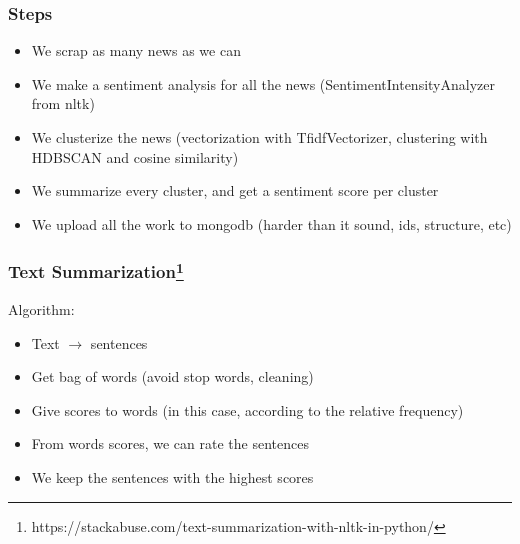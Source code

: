 \documentclass[12pt]{beamer}
\begin{document}
\begin{frame}
\frametitle{Steps}
\begin{itemize}
\item We scrap as many news as we can
\item We make a sentiment analysis for all the news (SentimentIntensityAnalyzer from nltk)
\item We clusterize the news (vectorization with TfidfVectorizer, clustering with HDBSCAN and cosine similarity)
\item We summarize every cluster, and get a sentiment score per cluster
\item We upload all the work to mongodb (harder than it sound, ids, structure, etc)
\end{itemize}
\end{frame}

\begin{frame}
\frametitle{Text Summarization\footnote[frame]{https://stackabuse.com/text-summarization-with-nltk-in-python/} } 
Algorithm:
\begin{itemize}
\item Text $\rightarrow $ sentences
\item Get bag of words (avoid stop words, cleaning)
\item Give scores to words (in this case, according to the relative frequency)
\item From words scores, we can rate the sentences
\item We keep the sentences with the highest scores
\end{itemize}


\end{frame}
\end{document}
